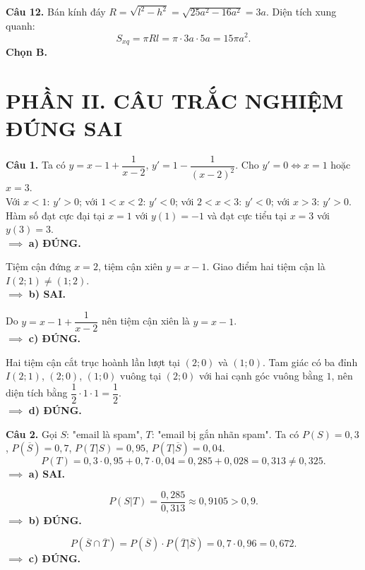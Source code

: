\documentclass[12pt,a4paper]{article}
\begin{document}
\vspace{0.25cm}
\noindent\textbf{Câu 12.} Bán kính đáy $R = \sqrt{l^2 - h^2} = \sqrt{25a^2 - 16a^2} = 3a$. Diện tích xung quanh:
\[
S_{xq} = \pi R l = \pi\cdot 3a\cdot 5a = 15\pi a^2.
\]
\textbf{Chọn B.}

\vspace{0.4cm}
\section*{\large PHẦN II. CÂU TRẮC NGHIỆM ĐÚNG SAI}

\noindent\textbf{Câu 1.} Ta có $y = x - 1 + \dfrac{1}{x - 2}$, $y' = 1 - \dfrac{1}{(x - 2)^2}$. Cho $y' = 0 \iff x = 1$ hoặc $x = 3$.\\
Với $x < 1$: $y' > 0$; với $1 < x < 2$: $y' < 0$; với $2 < x < 3$: $y' < 0$; với $x > 3$: $y' > 0$.\\
Hàm số đạt cực đại tại $x = 1$ với $y(1) = -1$ và đạt cực tiểu tại $x = 3$ với $y(3) = 3$.\\
$\implies$ \textbf{a) ĐÚNG.}

Tiệm cận đứng $x = 2$, tiệm cận xiên $y = x - 1$. Giao điểm hai tiệm cận là $I(2; 1) \ne (1; 2)$.\\
$\implies$ \textbf{b) SAI.}

Do $y = x - 1 + \dfrac{1}{x - 2}$ nên tiệm cận xiên là $y = x - 1$.\\
$\implies$ \textbf{c) ĐÚNG.}

Hai tiệm cận cắt trục hoành lần lượt tại $(2; 0)$ và $(1; 0)$. Tam giác có ba đỉnh $I(2; 1)$, $(2; 0)$, $(1; 0)$ vuông tại $(2; 0)$ với hai cạnh góc vuông bằng $1$, nên diện tích bằng $\dfrac{1}{2}\cdot 1\cdot 1 = \dfrac{1}{2}$.\\
$\implies$ \textbf{d) ĐÚNG.}

\vspace{0.3cm}
\noindent\textbf{Câu 2.} Gọi $S$: "email là spam", $T$: "email bị gắn nhãn spam". Ta có $P(S) = 0{,}3$, $P(\overline{S}) = 0{,}7$, $P(T|S) = 0{,}95$, $P(T|\overline{S}) = 0{,}04$.
\[
P(T) = 0{,}3\cdot 0{,}95 + 0{,}7\cdot 0{,}04 = 0{,}285 + 0{,}028 = 0{,}313 \ne 0{,}325.
\]
$\implies$ \textbf{a) SAI.}

\[
P(S|T) = \dfrac{0{,}285}{0{,}313} \approx 0{,}9105 > 0{,}9.
\]
$\implies$ \textbf{b) ĐÚNG.}

\[
P(\overline{S}\cap\overline{T}) = P(\overline{S})\cdot P(\overline{T}|\overline{S}) = 0{,}7\cdot 0{,}96 = 0{,}672.
\]
$\implies$ \textbf{c) ĐÚNG.}
\end{document}
